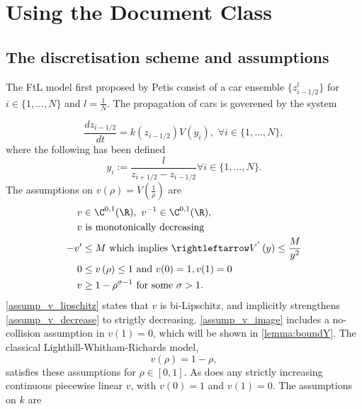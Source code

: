 \chapter{Using the Document Class}
\label{chap:usage}


\section{The discretisation scheme and assumptions}
The FtL model first proposed by Petis consist of a car ensemble $\{z^l_{i-1/2}\}$ for $i \in \{1,...,N\}$ and $l = \frac{1}{N}$. The propagation of cars is goverened by the system

\cite{argall2002rigorous}

\begin{equation} \label{FtL_model}
    \frac{d z_{i-1/2}}{dt} = k(z_{i-1/2}) V( y_i), \, \, \forall i \in \{1,...,N\}, 
\end{equation}
where the following has been defined 
\begin{equation}
    y_i := \frac{l}{z_{i+1/2} - z_{i-1/2}} \forall i \in \{1,...,N\}.  
\end{equation}
The assumptions on $v\left(\rho\right) = V\left(\frac{1}{\rho}\right)$ are 
\begin{align} 
    v &\in \C^{0,1}(\R), \, \, v^{-1} \in \C^{0,1}(\R), \label{assump_v_lipschitz} \\
    v &\text{ is monotonically decreasing} \label{assump_v_decrease}\\
    -v' &\leq M \text{ which implies }\rightleftarrow V^{'}\left(y\right) \leq \frac{M}{y^2} \label{assump_v_derivative}\\
    0&\leq v\left(\rho\right) \leq 1 \text{ and } v(0) = 1, v(1) = 0\label{assump_v_image}\\
    v&\geq 1 - \rho^{\sigma - 1} \text{ for some } \sigma > 1 \label{assump_v_lower_bound}. 
\end{align}
\eqref{assump_v_lipschitz} states that $v$ is bi-Lipschitz, and implicitly strengthens \eqref{assump_v_decrease} to strigtly decreasing. \eqref{assump_v_image} includes a no-collision assumption in $v(1) = 0$, which will be shown in \eqref{lemma:boundY}. The classical Lighthill-Whitham-Richards model, 
\begin{equation}
    v(\rho) = 1 - \rho,
\end{equation}
satisfies these assumptions for $\rho \in [0,1]$. As does any strictly increasing continuous piecewise linear $v$, with $v(0) = 1$ and $v(1) = 0$. 
The assumptions on $k$ are 

